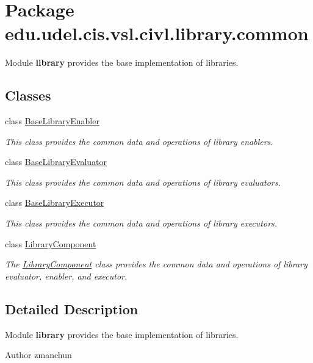 \hypertarget{namespaceedu_1_1udel_1_1cis_1_1vsl_1_1civl_1_1library_1_1common}{}\section{Package edu.\+udel.\+cis.\+vsl.\+civl.\+library.\+common}
\label{namespaceedu_1_1udel_1_1cis_1_1vsl_1_1civl_1_1library_1_1common}


Module {\bfseries library} provides the base implementation of libraries.  


\subsection*{Classes}
\begin{DoxyCompactItemize}
\item 
class \hyperlink{classedu_1_1udel_1_1cis_1_1vsl_1_1civl_1_1library_1_1common_1_1BaseLibraryEnabler}{Base\+Library\+Enabler}
\begin{DoxyCompactList}\small\item\em This class provides the common data and operations of library enablers. \end{DoxyCompactList}\item 
class \hyperlink{classedu_1_1udel_1_1cis_1_1vsl_1_1civl_1_1library_1_1common_1_1BaseLibraryEvaluator}{Base\+Library\+Evaluator}
\begin{DoxyCompactList}\small\item\em This class provides the common data and operations of library evaluators. \end{DoxyCompactList}\item 
class \hyperlink{classedu_1_1udel_1_1cis_1_1vsl_1_1civl_1_1library_1_1common_1_1BaseLibraryExecutor}{Base\+Library\+Executor}
\begin{DoxyCompactList}\small\item\em This class provides the common data and operations of library executors. \end{DoxyCompactList}\item 
class \hyperlink{classedu_1_1udel_1_1cis_1_1vsl_1_1civl_1_1library_1_1common_1_1LibraryComponent}{Library\+Component}
\begin{DoxyCompactList}\small\item\em The \hyperlink{classedu_1_1udel_1_1cis_1_1vsl_1_1civl_1_1library_1_1common_1_1LibraryComponent}{Library\+Component} class provides the common data and operations of library evaluator, enabler, and executor. \end{DoxyCompactList}\end{DoxyCompactItemize}


\subsection{Detailed Description}
Module {\bfseries library} provides the base implementation of libraries. 

\begin{DoxyAuthor}{Author}
zmanchun 
\end{DoxyAuthor}
